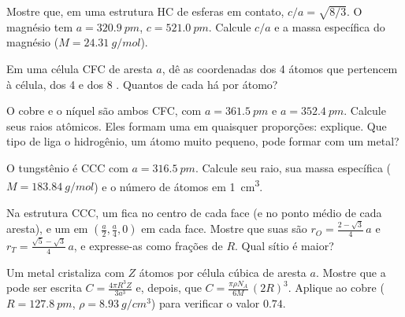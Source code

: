 \begin{exercise}[$\star\star$]\label{exo:b1:crystals-metals:6}
Mostre que, em uma estrutura HC de esferas em contato, $c/a = \sqrt{8/3}$.
O magnésio tem $a = \qty{320.9}{pm}$, $c = \qty{521.0}{pm}$. Calcule $c/a$
e a massa específica do magnésio ($M = \qty{24.31}{g/mol}$).
\end{exercise}

\begin{exercise}[$\star\star$]\label{exo:b1:crystals-metals:7}
Em uma célula CFC de aresta $a$, dê as coordenadas dos 4 átomos que
pertencem à célula, dos 4  e dos 8 . Quantos de cada há por átomo?
\end{exercise}

\begin{exercise}[$\star\star$]\label{exo:b1:crystals-metals:8}
O cobre e o níquel são ambos CFC, com $a = \qty{361.5}{pm}$ e
$a = \qty{352.4}{pm}$. Calcule seus raios atômicos. Eles formam uma
 em quaisquer proporções: explique. Que tipo de liga
o hidrogênio, um átomo muito pequeno, pode formar com um metal?
\end{exercise}

\begin{exercise}[$\star\star$]\label{exo:b1:crystals-metals:9}
O tungstênio é CCC com $a = \qty{316.5}{pm}$. Calcule seu raio, sua
massa específica ($M = \qty{183.84}{g/mol}$) e o número de átomos em
\qty{1}{cm^3}.
\end{exercise}

\begin{exercise}[$\star\star\star$]\label{exo:b1:crystals-metals:10}
Na estrutura CCC, um  fica no centro de cada face (e no
ponto médio de cada aresta), e um  em
$(\frac{a}{2}, \frac{a}{4}, 0)$ em cada face. Mostre que suas
 são $r_O = \frac{2 - \sqrt3}{4}\,a$ e
$r_T = \frac{\sqrt5 - \sqrt3}{4}\,a$, e expresse-as como frações de
$R$. Qual sítio é maior?
\end{exercise}

\begin{exercise}[$\star\star\star$]\label{exo:b1:crystals-metals:11}
Um metal cristaliza com $Z$ átomos por célula cúbica de aresta $a$.
Mostre que a  pode ser escrita $C = \frac{4\pi R^3 Z}{3a^3}$ e,
depois, que $C = \frac{\pi\rho N_A}{6M}\,(2R)^3$. Aplique ao cobre
($R = \qty{127.8}{pm}$, $\rho = \qty{8.93}{g/cm^3}$) para verificar o
valor $0.74$.
\end{exercise}

